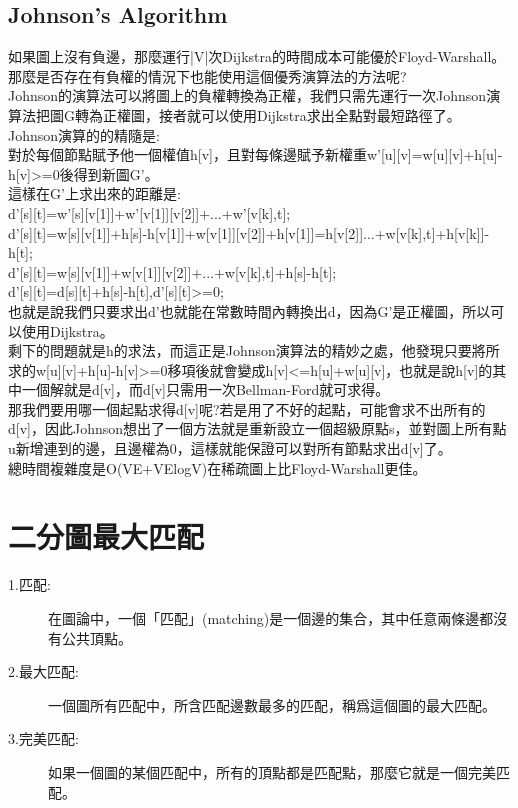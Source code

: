 \documentclass{article}
\begin{document}
\subsection{Johnson's Algorithm}
如果圖上沒有負邊，那麼運行|V|次Dijkstra的時間成本可能優於Floyd-Warshall。那麼是否存在有負權的情況下也能使用這個優秀演算法的方法呢?\\
Johnson的演算法可以將圖上的負權轉換為正權，我們只需先運行一次Johnson演算法把圖G轉為正權圖，接者就可以使用Dijkstra求出全點對最短路徑了。\\
Johnson演算的的精隨是:\\
對於每個節點賦予他一個權值h[v]，且對每條邊賦予新權重w'[u][v]=w[u][v]+h[u]-h[v]>=0後得到新圖G'。\\
這樣在G'上求出來的距離是:\\
d'[s][t]=w'[s][v[1]]+w'[v[1]][v[2]]+...+w'[v[k],t];\\
d'[s][t]=w[s][v[1]]+h[s]-h[v[1]]+w[v[1]][v[2]]+h[v[1]]=h[v[2]]...+w[v[k],t]+h[v[k]]-h[t];\\
d'[s][t]=w[s][v[1]]+w[v[1]][v[2]]+...+w[v[k],t]+h[s]-h[t];\\
d'[s][t]=d[s][t]+h[s]-h[t],d'[s][t]>=0;\\
也就是說我們只要求出d'也就能在常數時間內轉換出d，因為G'是正權圖，所以可以使用Dijkstra。\\
剩下的問題就是h的求法，而這正是Johnson演算法的精妙之處，他發現只要將所求的w[u][v]+h[u]-h[v]>=0移項後就會變成h[v]<=h[u]+w[u][v]，也就是說h[v]的其中一個解就是d[v]，而d[v]只需用一次Bellman-Ford就可求得。\\
那我們要用哪一個起點求得d[v]呢?若是用了不好的起點，可能會求不出所有的d[v]，因此Johnson想出了一個方法就是重新設立一個超級原點s，並對圖上所有點u新增連到的邊，且邊權為0，這樣就能保證可以對所有節點求出d[v]了。\\
總時間複雜度是O(VE+VElogV)在稀疏圖上比Floyd-Warshall更佳。\\

\section{二分圖最大匹配}
\begin{description}
\item[ 1.匹配:]在圖論中，一個「匹配」(matching)是一個邊的集合，其中任意兩條邊都沒有公共頂點。
\item[ 2.最大匹配:]一個圖所有匹配中，所含匹配邊數最多的匹配，稱爲這個圖的最大匹配。
\item[ 3.完美匹配:]如果一個圖的某個匹配中，所有的頂點都是匹配點，那麼它就是一個完美匹配。
\end{description}
\end{document}
